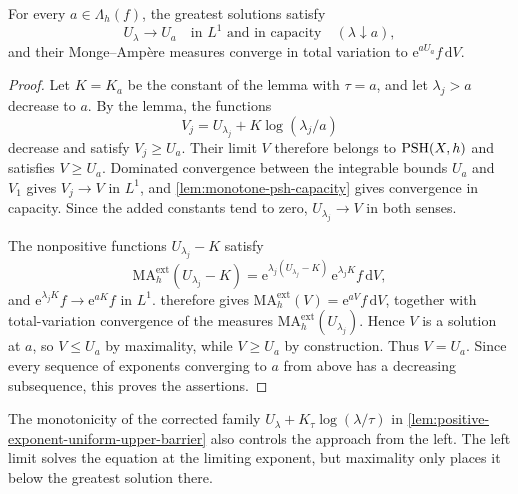 \begin{proposition}\label{prop:greatest-exponential-right-continuity}
For every $a\in\Lambda_h(f)$, the greatest solutions satisfy
\[
 U_\lambda\longrightarrow U_a
       \quad\text{in }L^1\text{ and in capacity}\quad(\lambda\downarrow a),
\]
and their Monge--Amp\`ere measures converge in total variation to $\mathrm e^{aU_a}f\,\mathrm dV$.
\end{proposition}
\begin{proof}
Let $K=K_a$ be the constant of the lemma with $\tau=a$, and let $\lambda_j>a$ decrease to $a$. By the lemma, the functions
\[
 V_j=U_{\lambda_j}+K\log(\lambda_j/a)
\]
decrease and satisfy $V_j\geq U_a$. Their limit $V$ therefore belongs to $\mathrm{PSH}(X,h)$ and satisfies $V\geq U_a$. Dominated convergence between the integrable bounds $U_a$ and $V_1$ gives $V_j\to V$ in $L^1$, and \cref{lem:monotone-psh-capacity} gives convergence in capacity. Since the added constants tend to zero, $U_{\lambda_j}\to V$ in both senses.

The nonpositive functions $U_{\lambda_j}-K$ satisfy
\[
 \mathrm{MA}^{\mathrm{ext}}_h(U_{\lambda_j}-K)=\mathrm e^{\lambda_j(U_{\lambda_j}-K)}\,\mathrm e^{\lambda_jK}f\,\mathrm dV,
\]
and $\mathrm e^{\lambda_jK}f\to\mathrm e^{aK}f$ in $L^1$.  therefore gives $\mathrm{MA}^{\mathrm{ext}}_h(V)=\mathrm e^{aV}f\,\mathrm dV$, together with total-variation convergence of the measures $\mathrm{MA}^{\mathrm{ext}}_h(U_{\lambda_j})$. Hence $V$ is a solution at $a$, so $V\leq U_a$ by maximality, while $V\geq U_a$ by construction. Thus $V=U_a$. Since every sequence of exponents converging to $a$ from above has a decreasing subsequence, this proves the assertions.
\end{proof}

The monotonicity of the corrected family $U_\lambda+K_\tau\log(\lambda/\tau)$ in \cref{lem:positive-exponent-uniform-upper-barrier} also controls the approach from the left. The left limit solves the equation at the limiting exponent, but maximality only places it below the greatest solution there.

